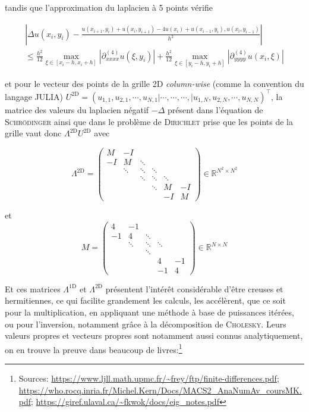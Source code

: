 \documentclass[svgnames,dvipsnames,a4paper,10pt,french]{report}
\begin{document}
\begin{appendices}
tandis que l'approximation du laplacien à 5 points vérifie

\begin{multline}
    \left| \Delta u(x_i,y_i) - \frac{u(x_{i+1},y_i) + u(x_{i},y_{i+1}) - 4 u(x_i) + u(x_{i-1}, y_i), u(x_{i}, y_{i-1})}{h^2}\right|  \\
    \le \frac{h^2}{12}\underset{\xi\in[x_i-h,x_i+h]}{\max} |\partial_{xxxx}^{(4)}u(\xi,y_i) | + \frac{h^2}{12}\underset{\xi\in[y_i-h,y_i+h]}{\max} |\partial_{yyyy}^{(4)}u(x_i,\xi) |
\end{multline}

et pour le vecteur des points de la grille 2D \textit{column-wise} (comme la convention du langage JULIA) $U^{\text{2D}} = (u_{1,1},u_{2,1}, \cdots, u_{N,1} | \cdots, \cdots, \cdots, | u_{1,N},u_{2,N}, \cdots, u_{N,N} )^\top$, la matrice des valeurs du laplacien négatif $-\Delta$ présent dans l'équation de \textsc{Schrödinger} ainsi que dans le problème de \textsc{Dirichlet} prise que les points de la grille vaut donc $\Lambda^{\text{2D}} U^{\text{2D}}$ avec


\begin{equation}
\label{eq:lapl_2d_mat}
\Lambda^{\text{2D}} =  \begin{pmatrix}
M & -I &  &  &  &  \\
-I & M & \ddots &  &  &  \\
 & \ddots & \ddots & \ddots &  &  \\
 &  & \ddots & \ddots & \ddots &  \\
 &  &  & \ddots & M & -I \\[8pt]
 &  &  &  & -I & M 
\end{pmatrix}  \in\mathbb{R}^{N^2\times N^2} 
\end{equation}

et 
\begin{equation}
M =  \begin{pmatrix}
4 & -1 &  &  &  \\
-1 & 4 & \ddots &  &  \\
 & \ddots & \ddots & \ddots &  \\
 &  & \ddots &  &  \\
 &  &  & 4 & -1 \\[8pt]
 &  &  & -1 & 4 
\end{pmatrix}  \in\mathbb{R}^{N\times N} 
\end{equation}

Et ces matrices $\Lambda^{\text{1D}}$ et $\Lambda^{\text{2D}}$ présentent l'intérêt considérable d'être creuses et hermitiennes, ce qui facilite grandement les calculs, les accélèrent, que ce soit pour la multiplication, en appliquant une méthode à base de puissances itérées, ou pour l'inversion, notamment grâce à la décomposition de \textsc{Cholesky}. Leurs valeurs propres et vecteurs propres sont notamment aussi connus analytiquement, on en trouve la preuve dans beaucoup de  livres:\footnote{Sources: \url{https://www.ljll.math.upmc.fr/~frey/ftp/finite-differences.pdf}; \url{https://who.rocq.inria.fr/Michel.Kern/Docs/MACS2_AnaNumAv_coursMK.pdf}; \url{https://giref.ulaval.ca/~fkwok/docs/eig_notes.pdf}}


\end{appendices}
\end{document}
